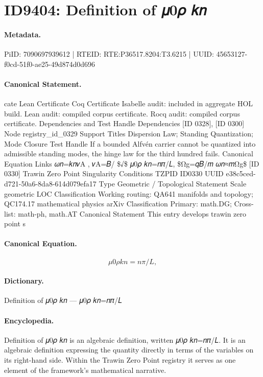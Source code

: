 \section*{ID9404: Definition of 𝜇0𝜌 𝑘𝑛}
\paragraph{Metadata.}
PiID: 7090697939612 | RTEID: RTE:P36517.8204:T3.6215 | UUID: 45653127-f0cd-51f0-ae25-49d874d0d696

\paragraph{Canonical Statement.}
cate Lean Certificate Coq Certificate Isabelle audit: included in aggregate HOL build. Lean audit: compiled corpus certificate. Rocq audit: compiled corpus certificate. Dependencies and Test Handle Dependencies [ID 0328], [ID 0300] Node registry\_id\_0329 Support Titles Dispersion Law; Standing Quantization; Mode Closure Test Handle If a bounded Alfvén carrier cannot be quantized into admissible standing modes, the hinge law for the third hundred fails. Canonical Equation Links 𝜔𝑛=𝑘𝑛𝑣A , 𝑣A=𝐵/ \$√\$ 𝜇0𝜌 𝑘𝑛=𝑛𝜋/𝐿, \$Ωg=𝑞𝐵/𝑚 𝜔𝑛≈𝑚Ωg\$ [ID 0330] Trawin Zero Point Singularity Conditions TZPID ID0330 UUID e38c5ced-d721-50a6-8da8-614d079efa17 Type Geometric / Topological Statement Scale geometric LOC Classification Working routing: QA641 manifolds and topology; QC174.17 mathematical physics arXiv Classification Primary: math.DG; Cross-list: math-ph, math.AT Canonical Statement This entry develops trawin zero point s

\paragraph{Canonical Equation.}
\[
𝜇0𝜌 𝑘𝑛=𝑛𝜋/𝐿,
\]

\paragraph{Dictionary.}
Definition of 𝜇0𝜌 𝑘𝑛 — 𝜇0𝜌 𝑘𝑛=𝑛𝜋/𝐿

\paragraph{Encyclopedia.}
Definition of 𝜇0𝜌 𝑘𝑛 is an algebraic definition, written 𝜇0𝜌 𝑘𝑛=𝑛𝜋/𝐿. It is an algebraic definition expressing the quantity directly in terms of the variables on its right-hand side. Within the Trawin Zero Point registry it serves as one element of the framework's mathematical narrative.
